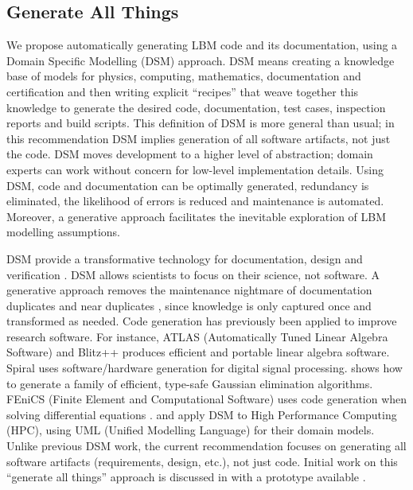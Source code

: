 \documentclass[final, 3p, times, authoryear]{elsarticle}
\begin{document}
\subsection{Generate All Things} \label{Sec_GenAllThings}

We propose automatically generating LBM code and its documentation, using a
Domain Specific Modelling (DSM) approach. DSM means creating a knowledge base of
models for physics, computing, mathematics, documentation and certification and
then writing explicit ``recipes'' that weave together this knowledge to generate
the desired code, documentation, test cases, inspection reports and build
scripts. This definition of DSM is more general than usual; in this
recommendation DSM implies generation of all software artifacts, not just the
code. DSM moves development to a higher level of abstraction; domain experts can
work without concern for low-level implementation details. Using DSM, code and
documentation can be optimally generated, redundancy is eliminated, the
likelihood of errors is reduced and maintenance is automated. Moreover, a
generative approach facilitates the inevitable exploration of LBM modelling
assumptions.

DSM provide a transformative technology for documentation, design and
verification \citep{JohansonAndHasselbring2018, Smith2018}. DSM allows
scientists to focus on their science, not software.  A generative approach
removes the maintenance nightmare of documentation duplicates and near
duplicates \citep{LucivEtAl2018}, since knowledge is only captured once and
transformed as needed.  Code generation has previously been applied to improve
research software.  For instance, ATLAS (Automatically Tuned Linear Algebra
Software) \citep{WhaleyEtAl2001} and Blitz++ \citep{Veldhuizen1998} produces
efficient and portable linear algebra software.  Spiral \citep{Pueschel2001}
uses software/hardware generation for digital signal processing.
\citet{Carette2008} shows how to generate a family of efficient, type-safe
Gaussian elimination algorithms.  FEniCS (Finite Element and Computational
Software) uses code generation when solving differential equations
\citep{LoggEtAl2012}. \citet{OberEtAl2018} and \citet{MatkerimEtAl2013} apply
DSM to High Performance Computing (HPC), using UML (Unified Modelling Language)
for their domain models. Unlike previous DSM work, the current recommendation
focuses on generating all software artifacts (requirements, design, etc.), not
just code.  Initial work on this ``generate all things'' approach is discussed
in \citep{SzymczakEtAl2016} with a prototype available
\citep{CaretteEtAl2021-Drasil}.
\end{document}
